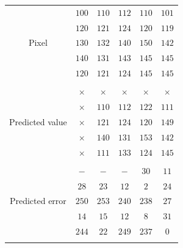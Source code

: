 \documentclass[journal]{IEEEtran}
\begin{document}
	\begin{figure}[!t]
		\centering
		\scriptsize
		\begin{tabular}{c|c|c|c|c|c|}
			\cline{2-6}
			\multirow{5}{*}{Pixel}
			&\(100\)   & \(110\) & \(112\) & \(110\) & \(101\)   \\ \cline{2-6}
			&\(120\)   & \(121\) & \(124\) & \(120\) & \(119\)   \\ \cline{2-6}
			&\(130\)   & \(132\) & \(140\) & \(150\) & \(142\)   \\ \cline{2-6} 
			&\(140\)   & \(131\) & \(143\) & \(145\) & \(145\)   \\ \cline{2-6}
			&\(120\)   & \(121\) & \(124\) & \(145\) & \(145\)   \\ \cline{2-6}
			
			\multicolumn{6}{c}{{}} \\
			
			\cline{2-6}
			\multirow{5}{*}{Predicted value}
			&\(\times\) & \(\times\) & \(\times\) & \(\times\) &\(\times\) \\ \cline{2-6}
			&\(\times\) & \(110\)    & \(112\)    & \(122\)    & \(111\)   \\ \cline{2-6}
			&\(\times\) & \(121\)    & \(124\)    & \(120\)    & \(149\)   \\ \cline{2-6}
			&\(\times\) & \(140\)    & \(131\)    & \(153\)    & \(142\)   \\ \cline{2-6} 
			&\(\times\) & \(111\)    & \(133\)    & \(124\)    & \(145\)   \\ \cline{2-6}
			
			\multicolumn{6}{c}{{}} \\
			
			\cline{2-6}
			\multirow{5}{*}{Predicted error}
			&\(-\) 		& \(-\) 	 & \(-\) 	  & \(30\)  & \(11\)  \\ \cline{2-6}
			&\(28\)     & \(23\)     & \(12\)     & \(2\)   & \(24\)  \\ \cline{2-6}
			&\(250\)    & \(253\)    & \(240\)    & \(238\) & \(27\)  \\ \cline{2-6}
			&\(14\)     & \(15\)     & \(12\)     & \(8\)   & \(31\)  \\ \cline{2-6} 
			&\(244\)    & \(22\)     & \(249\)    & \(237\) & \(0\)   \\ \cline{2-6}
			
			\multicolumn{6}{c}{{}} \\
			

\end{tabular}
\end{figure}
\end{document}
